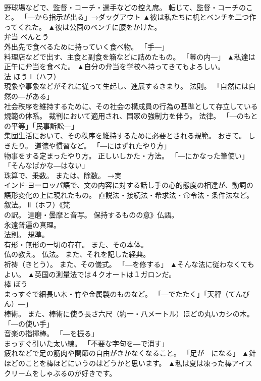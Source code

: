 \documentclass[8pt]{extreport}
\begin{document}
\begin{CJK}{UTF8}{min}
\\	野球場などで、監督・コーチ・選手などの控え席。 転じて、監督・コーチのこと。 「―から指示が出る」→ダッグアウト	▲彼は私たちに机とベンチを二つ作ってくれた。 ▲彼は公園のベンチに腰をかけた。
\\	弁当	べんとう	
\\	外出先で食べるために持っていく食べ物。 「手―」 
\\	料理店などで出す、主食と副食を箱などに詰めたもの。 「幕の内―」	▲私達は正午に弁当を食べた。 ▲自分の弁当を学校へ持ってきてもよろしい。
\\	法	ほう	Ⅰ（ハフ） 
\\	現象や事象などがそれに従って生起し、進展するきまり。 法則。 「自然には自然の―がある」 
\\	社会秩序を維持するために、その社会の構成員の行為の基準として存立している規範の体系。 裁判において適用され、国家の強制力を伴う。 法律。 「―のもとの平等」「民事訴訟―」 
\\	集団生活において、その秩序を維持するために必要とされる規範。 おきて。 しきたり。 道徳や慣習など。 「―にはずれたやり方」 
\\	物事をする定まったやり方。 正しいしかた・方法。 「―にかなった筆使い」「そんなばかな―はない」 
\\	珠算で、乗数。 または、除数。 →実 
\\	インド‐ヨーロッパ語で、文の内容に対する話し手の心的態度の相違が、動詞の語形変化の上に現れたもの。 直説法・接続法・希求法・命令法・条件法など。 叙法。 Ⅱ（ホフ）《梵
\\	の訳。 達磨・曇摩と音写。 保持するものの意》仏語。 
\\	永遠普遍の真理。 
\\	法則。 規準。 
\\	有形・無形の一切の存在。 また、その本体。 
\\	仏の教え。 仏法。 また、それを記した経典。 
\\	祈祷（きとう）。 また、その儀式。 「―を修する」	▲そんな法に従わなくてもよい。 ▲英国の測量法では４クオートは１ガロンだ。
\\	棒	ぼう	
\\	まっすぐで細長い木・竹や金属製のものなど。 「―でたたく」「天秤（てんびん）―」 
\\	棒術。 また、棒術に使う長さ六尺（約一・八メートル）ほどの丸いカシの木。 「―の使い手」 
\\	音楽の指揮棒。 「―を振る」 
\\	まっすぐ引いた太い線。 「不要な字句を―で消す」 
\\	疲れなどで足の筋肉や関節の自由がきかなくなること。 「足が―になる」	▲針ほどのことを棒ほどにいうのはどうかと思います。 ▲私は夏は凍った棒アイスクリームをしゃぶるのが好きです。

\end{CJK}
\end{document}
